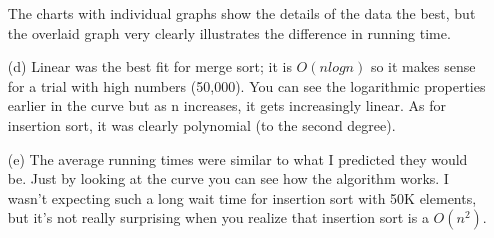 \documentclass[10pt,a4paper]{report}
\begin{document}
\begin{enumerate}
		The charts with individual graphs show the details of the data the best, but the overlaid graph very clearly illustrates the difference in running time.
		
		\item[(d)] Linear was the best fit for merge sort; it is $O(nlogn)$ so it makes sense for a trial with high numbers (50,000). You can see the logarithmic properties earlier in the curve but as n increases, it gets increasingly linear. As for insertion sort, it was clearly polynomial (to the second degree).
		
		\item[(e)] The average running times were similar to what I predicted they would be. Just by looking at the curve you can see how the algorithm works. I wasn't expecting such a long wait time for insertion sort with 50K elements, but it's not really surprising when you realize that insertion sort is a $O(n^2)$.
	\end{enumerate}
	
	
	
\end{document}
